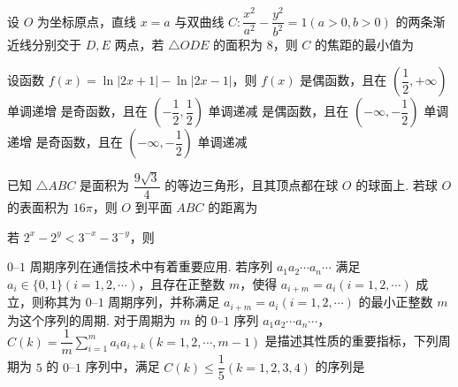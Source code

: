 \documentclass[a4paper,11pt]{report}
\begin{document}
\begin{examquestions}
\item 设 $O$ 为坐标原点，直线 $x=a$ 与双曲线 $C:\dfrac{x^2}{a^2}-\dfrac{y^2}{b^2}=1(a>0,b>0)$ 的两条渐近线分别交于 $D,E$ 两点，若 $\triangle ODE$ 的面积为 $8$，则 $C$ 的焦距的最小值为

\item 设函数 $f(x)=\ln|2x+1|-\ln|2x-1|$，则 $f(x)$
\onechoices
{是偶函数，且在 $\left(\dfrac12,+\infty\right)$ 单调递增}
{是奇函数，且在 $\left(-\dfrac12,\dfrac12\right)$ 单调递减}
{是偶函数，且在 $\left(-\infty,-\dfrac12\right)$ 单调递增}
{是奇函数，且在 $\left(-\infty,-\dfrac12\right)$ 单调递减}

\item 已知 $\triangle ABC$ 是面积为 $\dfrac{9\sqrt3}{4}$ 的等边三角形，且其顶点都在球 $O$ 的球面上. 若球 $O$ 的表面积为 $16\pi$，则 $O$ 到平面 $ABC$ 的距离为

\item 若 $2^x-2^y<3^{-x}-3^{-y}$，则
\item $0$--$1$ 周期序列在通信技术中有着重要应用. 若序列 $a_1a_2\cdots a_n\cdots$ 满足 $a_i\in\{0,1\}(i=1,2,\cdots)$，且存在正整数 $m$，使得 $a_{i+m}=a_i(i=1,2,\cdots)$ 成立，则称其为 $0$--$1$ 周期序列，并称满足 $a_{i+m}=a_i(i=1,2,\cdots)$ 的最小正整数 $m$ 为这个序列的周期. 对于周期为 $m$ 的 $0$--$1$ 序列 $a_1a_2\cdots a_n\cdots$，$C(k)=\dfrac1m\sum_{i=1}^m a_i a_{i+k}(k=1,2,\cdots,m-1)$ 是描述其性质的重要指标，下列周期为 $5$ 的 $0$--$1$ 序列中，满足 $C(k)\leq\dfrac15(k=1,2,3,4)$ 的序列是
\fourchoices{$11010\cdots$}{$11011\cdots$}{$10001\cdots$}{$11001\cdots$}

\end{examquestions}
\end{document}
